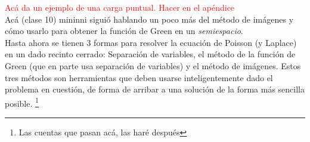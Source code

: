 \textcolor{red}{Acá da un ejemplo de una carga puntual. Hacer en el apéndice}\\ 
\indent Acá (clase 10) mininni siguió hablando un poco más del método de imágenes y cómo usarlo para obtener la función de Green en un \textit{semiespacio}.\\
\indent Hasta ahora se tienen 3 formas para resolver la ecuación de Poisson (y Laplace) en un dado recinto cerrado: Separación de variables, el método de la función de Green (que en parte usa separación de variables) y el método de imágenes. Estos tres métodos son herramientas que deben usarse inteligentemente dado el problema en cuestión, de forma de arribar a una solución de la forma más sencilla posible. \footnote{Las cuentas que pasan acá, las haré después }




